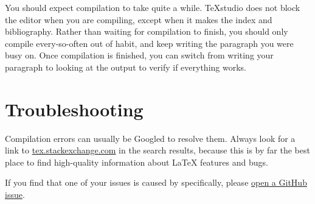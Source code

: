 You should expect compilation to take quite a while. TeXstudio does not block the editor when you are compiling, except when it makes the index and bibliography. Rather than waiting for compilation to finish, you should only compile every-so-often out of habit, and keep writing the paragraph you were busy on. Once compilation is finished, you can switch from writing your paragraph to looking at the output to verify if everything works.


\section{Troubleshooting}
Compilation errors can usually be Googled to resolve them. Always look for a link to \href{https://tex.stackexchange.com/}{tex.stackexchange.com} in the search results, because this is by far the best place to find high-quality information about \LaTeX{} features and bugs.

If you find that one of your issues is caused by \repo specifically, please \href{https://github.com/bauwenst/bauwemt/issues}{open a GitHub issue}.
